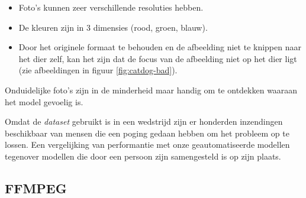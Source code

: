 \begin{itemize}
    \item Foto's kunnen zeer verschillende resoluties hebben.
    \item De kleuren zijn in 3 dimensies (rood, groen, blauw).
    \item Door het originele formaat te behouden en de afbeelding niet te knippen naar het dier zelf, kan het zijn dat de focus van de afbeelding niet op het dier ligt (zie afbeeldingen in figuur \ref{fig:catdog-bad}).
\end{itemize}

Onduidelijke foto's zijn in de minderheid maar handig om te ontdekken waaraan het model gevoelig is.

Omdat de \textit{dataset} gebruikt is in een wedstrijd zijn er honderden inzendingen beschikbaar van mensen die een poging gedaan hebben om het probleem op te lossen. Een vergelijking van performantie met onze geautomatiseerde modellen tegenover modellen die door een persoon zijn samengesteld is op zijn plaats.

\subsection{FFMPEG}
\label{subsec:ffmpeg}
